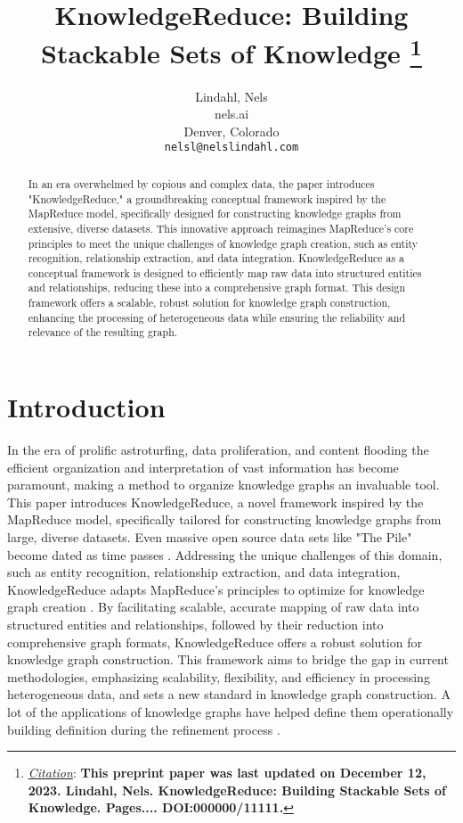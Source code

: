 \documentclass{article}
\title{KnowledgeReduce: Building Stackable Sets of Knowledge
\thanks{\textit{\underline{Citation}}: 
\textbf{This preprint paper was last updated on December 12, 2023. Lindahl, Nels. KnowledgeReduce: Building Stackable Sets of Knowledge. Pages.... DOI:000000/11111.}} 
}
\author{
  Lindahl, Nels \\
  nels.ai \\
  Denver, Colorado\\
   \texttt{nelsl@nelslindahl.com} \\
}
\begin{document}
\maketitle

\begin{abstract}
In an era overwhelmed by copious and complex data, the paper introduces "KnowledgeReduce," a groundbreaking conceptual framework inspired by the MapReduce model, specifically designed for constructing knowledge graphs from extensive, diverse datasets. This innovative approach reimagines MapReduce's core principles to meet the unique challenges of knowledge graph creation, such as entity recognition, relationship extraction, and data integration. KnowledgeReduce as a conceptual framework is designed to efficiently map raw data into structured entities and relationships, reducing these into a comprehensive graph format. This design framework offers a scalable, robust solution for knowledge graph construction, enhancing the processing of heterogeneous data while ensuring the reliability and relevance of the resulting graph.
\end{abstract}


\section{Introduction}
In the era of prolific astroturfing, data proliferation, and content flooding the efficient organization and interpretation of vast information has become paramount, making a method to organize knowledge graphs an invaluable tool. This paper introduces KnowledgeReduce, a novel framework inspired by the MapReduce model, specifically tailored for constructing knowledge graphs from large, diverse datasets. Even massive open source data sets like "The Pile" become dated as time passes \cite{gao2020pile}. Addressing the unique challenges of this domain, such as entity recognition, relationship extraction, and data integration, KnowledgeReduce adapts MapReduce's principles to optimize for knowledge graph creation \cite{dean2008mapreduce}. By facilitating scalable, accurate mapping of raw data into structured entities and relationships, followed by their reduction into comprehensive graph formats, KnowledgeReduce offers a robust solution for knowledge graph construction. This framework aims to bridge the gap in current methodologies, emphasizing scalability, flexibility, and efficiency in processing heterogeneous data, and sets a new standard in knowledge graph construction. A lot of the applications of knowledge graphs have helped define them operationally building definition during the refinement process \cite{ehrlinger2016towards}.
\end{document}
